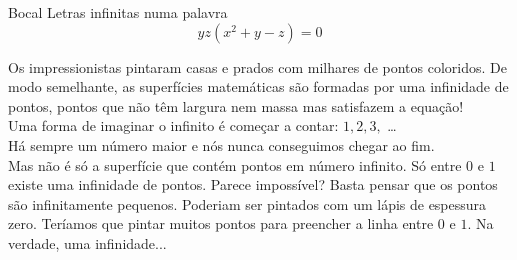 \begin{surferPage}{Bocal}
Letras infinitas numa palavra\\
\smallskip
\[y z (x^2	+ y - z)	= 0\]

\vspace{0.3cm}
Os impressionistas pintaram casas e prados com milhares de pontos coloridos. De modo semelhante, as superf\'icies matem\'aticas s\~ao formadas por uma infinidade de pontos, pontos que n\~ao t\^em largura nem massa mas satisfazem a equa\c c\~ao!\\
\vspace{0.3cm}
Uma forma de imaginar o infinito \'e come\c car a contar: $1, 2, 3,$ \dots\\
H\'a sempre um n\'umero maior e n\'os nunca conseguimos chegar ao fim.\\
\vspace{0.3cm}
Mas n\~ao \'e s\'o a superf\'icie que cont\'em pontos em n\'umero infinito. S\'o entre $0$ e $1$ existe uma infinidade de pontos.  Parece imposs\'ivel? Basta pensar que os pontos s\~ao infinitamente pequenos. Poderiam ser pintados com um l\'apis de espessura zero. Ter\'iamos que pintar muitos pontos para preencher a linha entre $0$ e $1$. Na verdade,  uma infinidade...
\end{surferPage}
